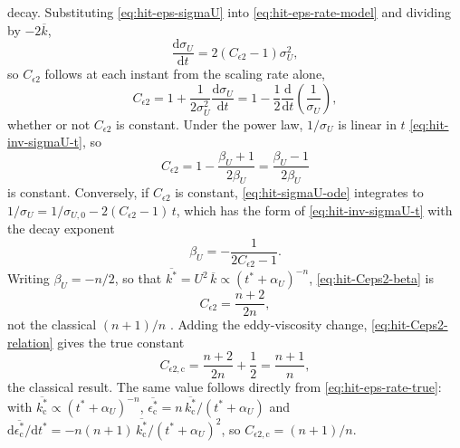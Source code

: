 \documentclass{article}
\begin{document}
decay. Substituting \eqref{eq:hit-eps-sigmaU} into \eqref{eq:hit-eps-rate-model}
and dividing by $-2\overline{k}$,
\begin{equation}\label{eq:hit-sigmaU-ode}
  \frac{\mathrm{d} \sigma_U}{\mathrm{d} t} = 2\left( C_{\epsilon 2} - 1 \right) \sigma_U^2 ,
\end{equation}
so $C_{\epsilon 2}$ follows at each instant from the scaling rate alone,
\begin{equation}\label{eq:hit-Ceps2-local}
  C_{\epsilon 2}
  = 1 + \frac{1}{2\sigma_U^2} \frac{\mathrm{d} \sigma_U}{\mathrm{d} t}
  = 1 - \frac{1}{2} \frac{\mathrm{d}}{\mathrm{d} t}\left( \frac{1}{\sigma_U} \right),
\end{equation}
whether or not $C_{\epsilon 2}$ is constant. Under the power law,
$1/\sigma_U$ is linear in $t$ \eqref{eq:hit-inv-sigmaU-t}, so
\begin{equation}\label{eq:hit-Ceps2-beta}
  C_{\epsilon 2} = 1 - \frac{\beta_U + 1}{2\beta_U} = \frac{\beta_U - 1}{2\beta_U}
\end{equation}
is constant. Conversely, if $C_{\epsilon 2}$ is constant,
\eqref{eq:hit-sigmaU-ode} integrates to
$1/\sigma_U = 1/\sigma_{U,0} - 2(C_{\epsilon 2} - 1)\, t$, which has the form
of \eqref{eq:hit-inv-sigmaU-t} with the decay exponent
\begin{equation}\label{eq:hit-betaU-Ceps2}
  \beta_U = -\frac{1}{2C_{\epsilon 2} - 1} .
\end{equation}
Writing $\beta_U = -n/2$, so that
$\overline{k^*} = U^2\, \overline{k} \propto (t^* + \alpha_U)^{-n}$,
\eqref{eq:hit-Ceps2-beta} is
\begin{equation}\label{eq:hit-Ceps2-n}
  C_{\epsilon 2} = \frac{n + 2}{2n},
\end{equation}
not the classical $(n + 1)/n$ \cite{pope2000turbulent}. Adding the
eddy-viscosity change, \eqref{eq:hit-Ceps2-relation} gives the true constant
\begin{equation}\label{eq:hit-Ceps2c-n}
  C_{\epsilon 2,\mathrm{c}} = \frac{n + 2}{2n} + \frac{1}{2} = \frac{n + 1}{n} ,
\end{equation}
the classical result. The same value follows directly from
\eqref{eq:hit-eps-rate-true}: with
$\overline{k_{\mathrm{c}}^*} \propto (t^* + \alpha_U)^{-n}$,
$\overline{\epsilon_{\mathrm{c}}^*} = n\, \overline{k_{\mathrm{c}}^*}/(t^* + \alpha_U)$
and $\mathrm{d}\overline{\epsilon_{\mathrm{c}}^*}/\mathrm{d}t^* = -n(n+1)\,\overline{k_{\mathrm{c}}^*}/(t^* + \alpha_U)^2$,
so $C_{\epsilon 2,\mathrm{c}} = (n+1)/n$.
\par
\end{document}
